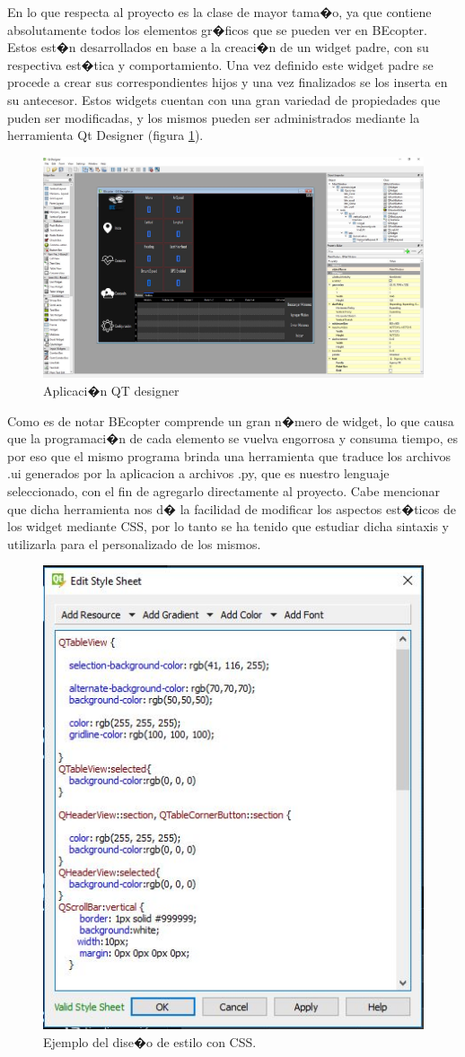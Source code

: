 En lo que respecta al proyecto es la clase de mayor tama�o, ya que contiene absolutamente todos los elementos gr�ficos que se pueden ver en BEcopter. Estos est�n desarrollados en base a la creaci�n de un widget padre, con su respectiva est�tica y comportamiento. Una vez definido este widget padre se procede a crear sus correspondientes hijos y una vez finalizados se los inserta en su antecesor. Estos widgets cuentan con una gran variedad de propiedades que puden ser modificadas, y los mismos pueden ser administrados mediante la herramienta Qt Designer (figura \ref{fig:qtdesigner}).

\begin{figure}[h!]
	\centering
	\includegraphics[width=0.7\linewidth, height=0.2\textheight]{Imagenes/qtDesigner}
	\caption{Aplicaci�n QT designer}
	\label{fig:qtdesigner}
\end{figure}


\par Como es de notar BEcopter comprende un gran n�mero de widget, lo que causa que la programaci�n de cada elemento se vuelva engorrosa y consuma tiempo, es por eso que el mismo programa brinda una herramienta que traduce los archivos .ui generados por la aplicacion a archivos .py, que es nuestro lenguaje seleccionado, con el fin de agregarlo directamente al proyecto. Cabe mencionar que dicha herramienta nos d� la facilidad de modificar los aspectos est�ticos de los widget mediante CSS, por lo tanto se ha tenido que estudiar dicha sintaxis y utilizarla para el personalizado de los mismos.

\begin{figure}[h!]
	\centering
	\includegraphics[width=0.5\linewidth, height=0.2\textheight]{Imagenes/ejemploCCS}
	\caption{Ejemplo del dise�o de estilo con CSS.}
	\label{fig:ejemploccs}
\end{figure}







